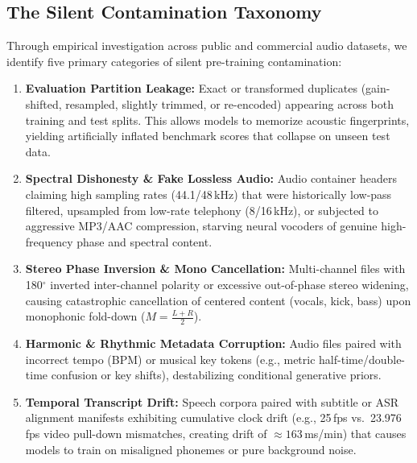 \documentclass[10pt,journal,compsoc]{IEEEtran}
\begin{document}
\subsection{The Silent Contamination Taxonomy}
Through empirical investigation across public and commercial audio datasets, we identify five primary categories of silent pre-training contamination:
\begin{enumerate}
    \item \textbf{Evaluation Partition Leakage:} Exact or transformed duplicates (gain-shifted, resampled, slightly trimmed, or re-encoded) appearing across both training and test splits. This allows models to memorize acoustic fingerprints, yielding artificially inflated benchmark scores that collapse on unseen test data.
    \item \textbf{Spectral Dishonesty \& Fake Lossless Audio:} Audio container headers claiming high sampling rates (44.1/48\,kHz) that were historically low-pass filtered, upsampled from low-rate telephony (8/16\,kHz), or subjected to aggressive MP3/AAC compression, starving neural vocoders of genuine high-frequency phase and spectral content.
    \item \textbf{Stereo Phase Inversion \& Mono Cancellation:} Multi-channel files with 180$^\circ$ inverted inter-channel polarity or excessive out-of-phase stereo widening, causing catastrophic cancellation of centered content (vocals, kick, bass) upon monophonic fold-down ($M = \frac{L+R}{2}$).
    \item \textbf{Harmonic \& Rhythmic Metadata Corruption:} Audio files paired with incorrect tempo (BPM) or musical key tokens (e.g., metric half-time/double-time confusion or key shifts), destabilizing conditional generative priors.
    \item \textbf{Temporal Transcript Drift:} Speech corpora paired with subtitle or ASR alignment manifests exhibiting cumulative clock drift (e.g., 25\,fps vs.\ 23.976\,fps video pull-down mismatches, creating drift of $\approx 163$\,ms/min) that causes models to train on misaligned phonemes or pure background noise.
\end{enumerate}
\end{document}
